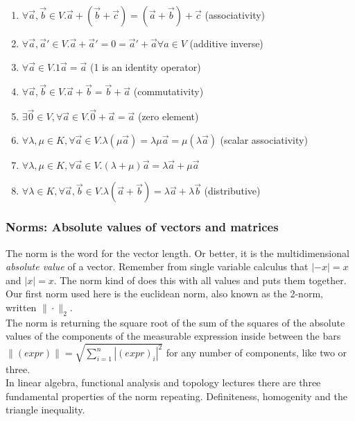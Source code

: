 \documentclass[a4paper]{article}
\begin{document}
\begin{enumerate}
\label{kvs_axioms}
\item $\forall \vec{a},\vec{b} \in V. \vec{a}+(\vec{b}+\vec{c}) = (\vec{a}+\vec{b})+\vec{c}$ (associativity)
\item $\forall \vec{a},\vec{a}' \in V. \vec{a} + \vec{a}' = 0 = \vec{a}' + \vec{a} \forall a \in V$ (additive inverse)
\item $\forall \vec{a} \in V. 1\vec{a} = \vec{a}$    (1 is an identity operator)
\item $\forall \vec{a},\vec{b} \in V.  \vec{a}+\vec{b}=\vec{b}+\vec{a}$ (commutativity)
\item $\exists \vec{0} \in V,\forall \vec{a} \in V. \vec{0}+\vec{a}=\vec{a}$ (zero element)
\item $\forall \lambda,\mu \in K, \forall \vec{a} \in V. \lambda(\mu\vec{a})=\lambda\mu\vec{a}=\mu(\lambda\vec{a})$ (scalar associativity)
\item $\forall \lambda,\mu \in K, \forall \vec{a} \in V. (\lambda + \mu)\vec{a} = \lambda\vec{a}+\mu\vec{a}$
\item $\forall \lambda \in K, \forall \vec{a}, \vec{b} \in V. \lambda(\vec{a}+\vec{b}) = \lambda\vec{a}+\lambda\vec{b}$  (distributive)
\end{enumerate}

\subsubsection{Norms: Absolute values of vectors and matrices}

The norm is the word for the vector length. Or better, it is the multidimensional \emph{absolute value} of a vector. Remember from single variable calculus that $|-x|=x$ and $|x|=x$. The norm kind of does this with all values and puts them together.
Our first norm used here is the euclidean norm, also known as the 2-norm, written $\|\cdot\|_{2}$. \\

 The norm is returning  the square root of the sum of the squares of the absolute values of the components of the measurable expression inside between the bars $\|(expr)\| = \sqrt{\sum_{i=1}^{n}|(expr)_{i}|^2}$ for any number of components, like two or three.\\

In linear algebra, functional analysis and topology lectures there are three fundamental properties of the norm repeating. Definiteness, homogenity and the triangle inequality. 
\end{document}
